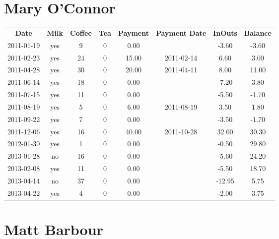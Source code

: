 \section{Mary O'Connor}

\begin{center}
\begin{tabular}{cccccccc}
\textbf{Date} & \textbf{Milk} & \textbf{Coffee} & \textbf{Tea} & \textbf{Payment} & \textbf{Payment Date} & \textbf{InOuts} & \textbf{Balance} \\
2011-01-19 & yes &  9 & 0 &  0.00 &  &  -3.60 & -3.60\\ 
2011-02-23 & yes & 24 & 0 & 15.00 & 2011-02-14 &   6.60 &  3.00\\ 
2011-04-28 & yes & 30 & 0 & 20.00 & 2011-04-11 &   8.00 & 11.00\\ 
2011-06-14 & yes & 18 & 0 &  0.00 &  &  -7.20 &  3.80\\ 
2011-07-15 & yes & 11 & 0 &  0.00 &  &  -5.50 & -1.70\\ 
2011-08-19 & yes &  5 & 0 &  6.00 & 2011-08-19 &   3.50 &  1.80\\ 
2011-09-22 & yes &  7 & 0 &  0.00 &  &  -3.50 & -1.70\\ 
2011-12-06 & yes & 16 & 0 & 40.00 & 2011-10-28 &  32.00 & 30.30\\ 
2012-01-30 & yes &  1 & 0 &  0.00 &  &  -0.50 & 29.80\\ 
2013-01-28 & no & 16 & 0 &  0.00 &  &  -5.60 & 24.20\\ 
2013-02-08 & yes & 11 & 0 &  0.00 &  &  -5.50 & 18.70\\ 
2013-04-14 & no & 37 & 0 &  0.00 &  & -12.95 &  5.75\\ 
2013-04-22 & yes &  4 & 0 &  0.00 &  &  -2.00 &  3.75
\end{tabular}
\end{center}

\section{Matt Barbour}

